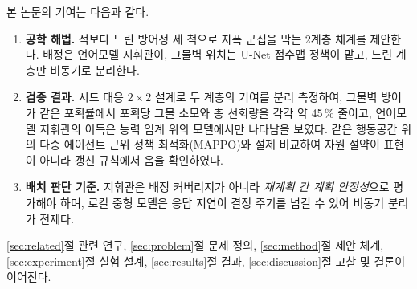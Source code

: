 본 논문의 기여는 다음과 같다.
\begin{enumerate}[leftmargin=*, itemsep=3pt, topsep=4pt]
\item \textbf{공학 해법.} 적보다 느린 방어정 세 척으로 자폭 군집을 막는 2계층 체계를 제안한다. 배정은
      언어모델 지휘관이, 그물벽 위치는 U-Net 점수맵 정책이 맡고, 느린 계층만 비동기로
      분리한다.
\item \textbf{검증 결과.} 시드 대응 $2\times2$ 설계로 두 계층의 기여를
      분리 측정하여, 그물벽 방어가 같은 포획률에서 포획당 그물 소모와 총
      선회량을 각각 약 45\,\% 줄이고, 언어모델 지휘관의 이득은 능력 임계 위의 모델에서만
      나타남을 보였다. 같은 행동공간 위의 다중 에이전트 근위 정책 최적화(MAPPO)와
      절제 비교하여 자원 절약이 표현이 아니라 갱신 규칙에서 옴을 확인하였다.
\item \textbf{배치 판단 기준.} 지휘관은 배정 커버리지가 아니라 \emph{재계획 간 계획
      안정성}으로 평가해야 하며, 로컬 중형 모델은 응답 지연이 결정 주기를 넘길 수 있어
      비동기 분리가 전제다.
\end{enumerate}

\noindent
\ref{sec:related}절 관련 연구, \ref{sec:problem}절 문제 정의, \ref{sec:method}절 제안 체계,
\ref{sec:experiment}절 실험 설계, \ref{sec:results}절 결과, \ref{sec:discussion}절 고찰 및
결론이 이어진다.
